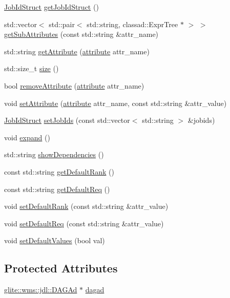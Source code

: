 \begin{CompactItemize}
\item 
\hyperlink{structglite_1_1wms_1_1jdl_1_1JobIdStruct}{Job\-Id\-Struct} \hyperlink{classglite_1_1wms_1_1jdl_1_1ExpDagAd_a13}{get\-Job\-Id\-Struct} ()
\item 
std::vector$<$ std::pair$<$ std::string, classad::Expr\-Tree $\ast$ $>$ $>$ \hyperlink{classglite_1_1wms_1_1jdl_1_1ExpDagAd_a14}{get\-Sub\-Attributes} (const std::string \&attr\_\-name)
\item 
std::string \hyperlink{classglite_1_1wms_1_1jdl_1_1ExpDagAd_a15}{get\-Attribute} (\hyperlink{classglite_1_1wms_1_1jdl_1_1ExpDagAd_w10}{attribute} attr\_\-name)
\item 
std::size\_\-t \hyperlink{classglite_1_1wms_1_1jdl_1_1ExpDagAd_a16}{size} ()
\item 
bool \hyperlink{classglite_1_1wms_1_1jdl_1_1ExpDagAd_a17}{remove\-Attribute} (\hyperlink{classglite_1_1wms_1_1jdl_1_1ExpDagAd_w10}{attribute} attr\_\-name)
\item 
void \hyperlink{classglite_1_1wms_1_1jdl_1_1ExpDagAd_a18}{set\-Attribute} (\hyperlink{classglite_1_1wms_1_1jdl_1_1ExpDagAd_w10}{attribute} attr\_\-name, const std::string \&attr\_\-value)
\item 
\hyperlink{structglite_1_1wms_1_1jdl_1_1JobIdStruct}{Job\-Id\-Struct} \hyperlink{classglite_1_1wms_1_1jdl_1_1ExpDagAd_a19}{set\-Job\-Ids} (const std::vector$<$ std::string $>$ \&jobids)
\item 
void \hyperlink{classglite_1_1wms_1_1jdl_1_1ExpDagAd_a20}{expand} ()
\item 
std::string \hyperlink{classglite_1_1wms_1_1jdl_1_1ExpDagAd_a21}{show\-Dependencies} ()
\item 
const std::string \hyperlink{classglite_1_1wms_1_1jdl_1_1ExpDagAd_a22}{get\-Default\-Rank} ()
\item 
const std::string \hyperlink{classglite_1_1wms_1_1jdl_1_1ExpDagAd_a23}{get\-Default\-Req} ()
\item 
void \hyperlink{classglite_1_1wms_1_1jdl_1_1ExpDagAd_a24}{set\-Default\-Rank} (const std::string \&attr\_\-value)
\item 
void \hyperlink{classglite_1_1wms_1_1jdl_1_1ExpDagAd_a25}{set\-Default\-Req} (const std::string \&attr\_\-value)
\item 
void \hyperlink{classglite_1_1wms_1_1jdl_1_1ExpDagAd_a26}{set\-Default\-Values} (bool val)
\end{CompactItemize}
\subsection*{Protected Attributes}
\begin{CompactItemize}
\item 
\hyperlink{classglite_1_1wms_1_1jdl_1_1DAGAd}{glite::wms::jdl::DAGAd} $\ast$ \hyperlink{classglite_1_1wms_1_1jdl_1_1ExpDagAd_p0}{dagad}
\end{CompactItemize}


